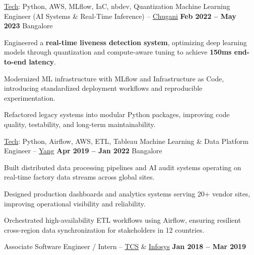\documentclass[11pt, a4paper]{awesome-cv}
\begin{document}
\begin{cventries}
\cventry
{\underline{Tech}: Python, AWS, MLflow, IaC, nbdev, Quantization}
{Machine Learning Engineer (AI Systems \& Real-Time Inference) – \underline{Chugani}}
{\textbf{Feb 2022 – May 2023}}
{Bangalore}
{
\begin{cvitems}
  \item {Engineered a \textbf{real-time liveness detection system}, optimizing deep learning models through quantization and compute-aware tuning to achieve \textbf{150ms end-to-end latency}.}
  \item {Modernized ML infrastructure with MLflow and Infrastructure as Code, introducing standardized deployment workflows and reproducible experimentation.}
  \item {Refactored legacy systems into modular Python packages, improving code quality, testability, and long-term maintainability.}
\end{cvitems}
}
\vspace{1.0em}

\cventry
{\underline{Tech}: Python, Airflow, AWS, ETL, Tableau}
{Machine Learning \& Data Platform Engineer – \underline{Yang}}
{\textbf{Apr 2019 – Jan 2022}}
{Bangalore}
{
\begin{cvitems}
  \item {Built distributed data processing pipelines and AI audit systems operating on real-time factory data streams across global sites.}
  \item {Designed production dashboards and analytics systems serving 20+ vendor sites, improving operational visibility and reliability.}
  \item {Orchestrated high-availability ETL workflows using Airflow, ensuring resilient cross-region data synchronization for stakeholders in 12 countries.}
\end{cvitems}
}

\vspace{1.0em}

\cventry
  {}
  {Associate Software Engineer / Intern – \underline{\href{https://www.tcs.com/}{TCS}} \& \underline{\href{https://www.infosys.com/}{Infosys}}}
  {\textbf{Jan 2018 – Mar 2019}}
  {}
  {}

\end{cventries}

\vspace{-3.5em}

\vspace{-0.3em}
\end{document}
